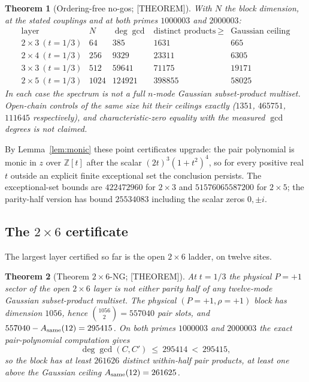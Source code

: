 \documentclass[11pt]{article}
\newtheorem{theorem}{Theorem}[section]
\theoremstyle{definition}
\newcommand{\Zb}{\mathbb{Z}}
\begin{document}
\begin{theorem}[Ordering-free no-gos; {[THEOREM]}]\label{thm:pairproducts}
With $N$ the block dimension, at the stated couplings and at both primes $1000003$ and $2000003$:
\[
\begin{array}{l|r|r|r|r}
\text{layer} & N & \deg\gcd & \text{distinct products}\ \ge & \text{Gaussian ceiling}\\ \hline
2\times3\ (t=1/3) & 64 & 385 & 1631 & 665\\
2\times4\ (t=1/3) & 256 & 9329 & 23311 & 6305\\
3\times3\ (t=1/3) & 512 & 59641 & 71175 & 19171\\
2\times5\ (t=1/3) & 1024 & 124921 & 398855 & 58025
\end{array}
\]
In each case the spectrum is not a full $n$-mode Gaussian subset-product multiset. Open-chain
controls of the same size hit their ceilings exactly ($1351$, $465751$, $111645$ respectively), and
characteristic-zero equality with the measured $\gcd$ degrees is \emph{not} claimed.
\end{theorem}

By Lemma~\ref{lem:monic} these point certificates upgrade: the pair polynomial is monic in $z$ over
$\Zb[t]$ after the scalar $(2t)^3(1+t^2)^4$, so for every positive real $t$ outside an explicit finite
exceptional set the conclusion persists. The exceptional-set bounds are $422472960$ for $2\times3$
and $51576065587200$ for $2\times5$; the parity-half version has bound $25534083$ including the
scalar zeros $0,\pm i$.

\subsection{The $2\times6$ certificate}\label{sec:2x6}
The largest layer certified so far is the open $2\times6$ ladder, on twelve sites.

\begin{theorem}[Theorem $2\times6$-NG; {[THEOREM]}]\label{thm:2x6}
At $t=1/3$ the physical $P=+1$ sector of the open $2\times6$ layer is not either parity half of any
twelve-mode Gaussian subset-product multiset. The physical $(P=+1,\rho=+1)$ block has dimension
$1056$, hence $\binom{1056}{2}=557040$ pair slots, and $557040-A_{\rm same}(12)=295415$. On both
primes $1000003$ and $2000003$ the exact pair-polynomial computation gives
\[
\deg\gcd(C,C')\ \le\ 295414\ <\ 295415 ,
\]
so the block has at least $261626$ distinct within-half pair products, at least one above the
Gaussian ceiling $A_{\rm same}(12)=261625$.
\end{theorem}
\end{document}
